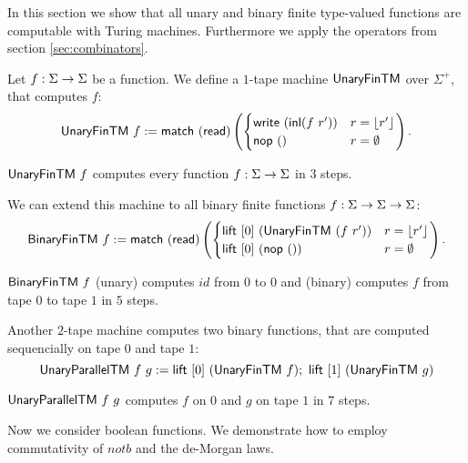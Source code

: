 \documentclass{psartcl}
\begin{document}
In this section we show that all unary and binary finite type-valued functions are computable with Turing machines.
Furthermore we apply the operators from section \ref{sec:combinators}.

Let $f : \Sigma \rightarrow \Sigma$ be a function.  We define a $1$-tape machine $\textsf{UnaryFinTM}$ over $\Sigma^+$, that computes $f$:
\begin{align*}
  \textsf{UnaryFinTM}~f :=
  \textsf{match}~(\textsf{read})
  \left(
    \begin{cases}
      \textsf{write}~(\operatorname{\textsf{inl}}(f~r'))   & r=\left\lfloor {r'}\right\rfloor \\
      \textsf{nop}~\mathbf{()}            & r=\emptyset
    \end{cases}
  \right).
\end{align*}
\begin{lemma}
  \label{lem:unary-fin-tm}
  $\textsf{UnaryFinTM}~f$ computes every function $f:\Sigma\rightarrow\Sigma$ in $3$ steps.
\end{lemma}

We can extend this machine to all binary finite functions $f:\Sigma\rightarrow\Sigma\rightarrow\Sigma$:
\begin{align*}
  \textsf{BinaryFinTM}~f :=
  \textsf{match}~(\textsf{read})
  \left(
    \begin{cases}
      \textsf{lift}~[0]~(\textsf{UnaryFinTM}~(f~r')) & r=\left\lfloor {r'}\right\rfloor \\
      \textsf{lift}~[0]~(\textsf{nop}~\mathbf{()})         & r=\emptyset
    \end{cases}
  \right).
\end{align*}
\begin{lemma}
  \label{lem:binary-fin-tm}
  $\textsf{BinaryFinTM}~f$ (unary) computes $id$ from $0$ to $0$ and (binary) computes $f$ from tape $0$ to tape $1$ in $5$ steps.
\end{lemma}

Another $2$-tape machine computes two binary functions, that are computed sequencially on tape $0$ and tape $1$:
$$ \textsf{UnaryParallelTM}~f~g := \textsf{lift}~[0]~(\textsf{UnaryFinTM}~f) ;~ \textsf{lift}~[1]~(\textsf{UnaryFinTM}~g) $$

\begin{lemma}
  \label{lem:parallel-fin-tm}
  $\textsf{UnaryParallelTM}~f~g$ computes $f$ on $0$ and $g$ on tape $1$ in $7$ steps.
\end{lemma}


Now we consider boolean functions.  We demonstrate how to employ commutativity of $notb$ and the de-Morgan laws.
\end{document}
